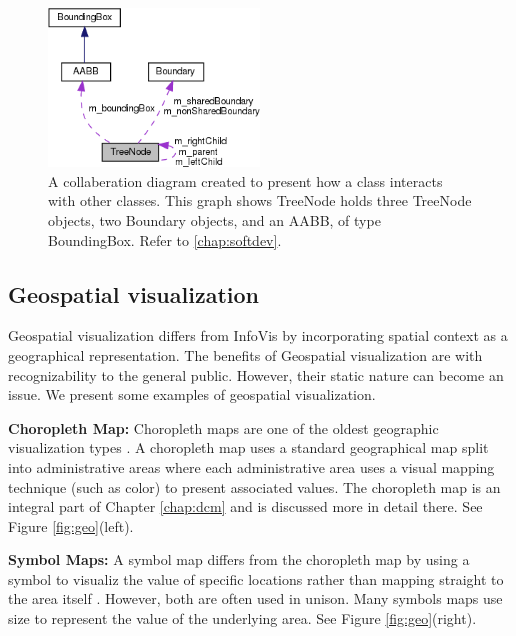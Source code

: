 \begin{figure}[b]
\centering
\includegraphics[width=0.5\textwidth]{images/ch1/graph}
\caption{A collaberation diagram created to present how a class interacts with other classes. This graph shows TreeNode holds three TreeNode objects, two Boundary objects, and an AABB, of type BoundingBox. Refer to \ref{chap:softdev}.} \label{fig:graph}
\end{figure}


\subsection{Geospatial visualization}
Geospatial visualization differs from InfoVis by incorporating spatial context as a geographical representation. The benefits of Geospatial visualization are with recognizability to the general public. However, their static nature can become an issue. We present some examples of geospatial visualization. 


\noindent
\textbf{Choropleth Map:} Choropleth maps are one of the oldest geographic visualization types \cite{dupin1827carte}. A choropleth map uses a standard geographical map split into administrative areas where each administrative area uses a visual mapping technique (such as color) to present associated values. The choropleth map is an integral part of Chapter \ref{chap:dcm} and is discussed more in detail there. See Figure \ref{fig:geo}(left).

\noindent
\textbf{Symbol Maps:} A symbol map differs from the choropleth map by using a symbol to visualiz the value of specific locations rather than mapping straight to the area itself \cite{cabello2010algorithmic}. However, both are often used in unison. Many symbols maps use size to represent the value of the underlying area. See Figure \ref{fig:geo}(right).
\vspace{1.2cm}

